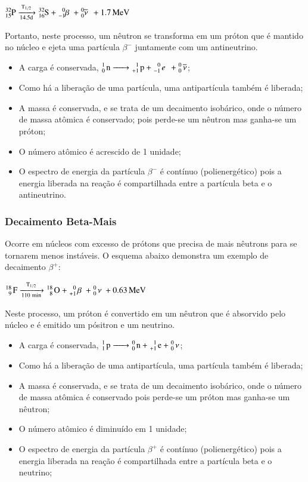 \documentclass[11pt,a4paper]{article}
\newcounter{exemplo}
\begin{document}
                \begin{center}
                    $\ce{^{32}_{15}P ->[{T_{1/2}}][{14.5d}] ^{32}_{16}S + ^{0}_{-1}\beta \; + ^{0}_{0}\overline{\nu} \; + 1.7 MeV}$
                \end{center}

    Portanto, neste processo, um nêutron se transforma em um próton que é mantido no núcleo e ejeta uma partícula $\beta^-$ juntamente com um antineutrino.

                \begin{itemize}
                    \item A carga é conservada, $\ce{^{1}_{0} n -> ^{1}_{+1} p + ^{0}_{-1} e \; + ^{0}_{0} \overline{\nu}}$;
                    \item Como há a liberação de uma partícula, uma antipartícula também é liberada; 
                    \item A massa é conservada, e se trata de um decaimento isobárico, onde o número de massa atômica é conservado; pois perde-se um nêutron mas ganha-se um próton;
                    \item O número atômico é acrescido de 1 unidade; 
                    \item O espectro de energia da partícula $\beta^-$ é contínuo (polienergético) pois a energia liberada na reação é compartilhada entre a partícula beta e o antineutrino.
                \end{itemize}

\subsubsection*{Decaimento Beta-Mais}

    Ocorre em núcleos com excesso de prótons que precisa de mais nêutrons para se tornarem menos instáveis. O esquema abaixo demonstra um exemplo de decaimento $\beta^+$:

                \begin{center}
                    $\ce{^{18}_{9} F ->[{T_{1/2}}][{110 min}] ^{18}_{8} O + ^{0}_{+1} \beta \; + ^{0}_{0} \nu \; + 0.63 MeV}$
                \end{center}

    Neste processo, um próton é convertido em um nêutron que é absorvido pelo núcleo e é emitido um pósitron e um neutrino.

	\begin{itemize}
		\item A carga é conservada, $\ce{^{1}_{1} p -> ^{0}_{0} n + ^{1}_{+1} e + ^{0}_{0} \nu}$;
		\item Como há a liberação de uma antipartícula, uma partícula também é liberada;
		\item A massa é conservada, e se trata de um decaimento isobárico, onde o número de massa atômica é conservado pois perde-se um próton mas ganha-se um nêutron;
		\item O número atômico é diminuído em 1 unidade;
		\item O espectro de energia da partícula $\beta^+$ é contínuo (polienergético) pois a energia liberada na reação é compartilhada entre a partícula beta e o neutrino;
	\end{itemize}
\end{document}
